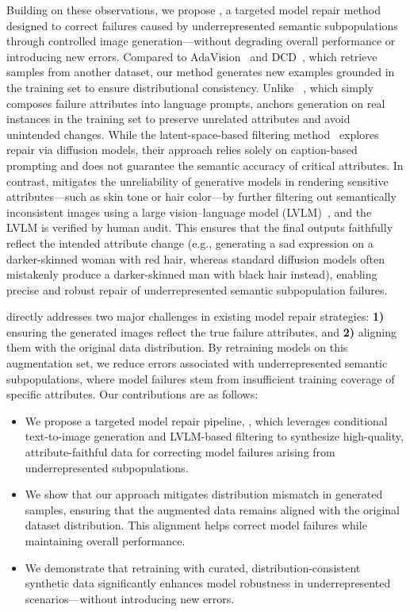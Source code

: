 Building on these observations, we propose \model, a targeted model repair method designed to correct failures caused by underrepresented semantic subpopulations through controlled image generation—without degrading overall performance or introducing new errors. Compared to AdaVision~\cite{gao2023adaptive} and DCD~\cite{singla2024data}, which retrieve samples from another dataset, our method generates new examples grounded in the training set to ensure distributional consistency. Unlike \safefix~\cite{chen2023safefix}, which simply composes failure attributes into language prompts, \model anchors generation on real instances in the training set to preserve unrelated attributes and avoid unintended changes. While the latent-space-based filtering method~\cite{jain2023latentfailures} explores repair via diffusion models, their approach relies solely on caption-based prompting and does not guarantee the semantic accuracy of critical attributes. In contrast, \model mitigates the unreliability of generative models in rendering sensitive attributes—such as skin tone or hair color—by further filtering out semantically inconsistent images using a large vision--language model (LVLM)~\cite{bai2025qwen25vl, liu2023improvedllava}, and the LVLM is verified by human audit. This ensures that the final outputs faithfully reflect the intended attribute change (e.g., generating a sad expression on a darker-skinned woman with red hair, whereas standard diffusion models often mistakenly produce a darker-skinned man with black hair instead), enabling precise and robust repair of underrepresented semantic subpopulation failures. 


\model directly addresses two major challenges in existing model repair strategies: {\bf 1)} ensuring the generated images reflect the true failure attributes, and {\bf 2)} aligning them with the original data distribution. By retraining models on this augmentation set, we reduce errors associated with underrepresented semantic subpopulations, where model failures stem from insufficient training coverage of specific attributes. Our contributions are as follows:
\begin{itemize}
\item We propose a targeted model repair pipeline, \model, which leverages conditional text-to-image generation and LVLM-based filtering to synthesize high-quality, attribute-faithful data for correcting model failures arising from underrepresented subpopulations.

\item We show that our approach mitigates distribution mismatch in generated samples, ensuring that the augmented data remains aligned with the original dataset distribution. This alignment helps correct model failures while maintaining overall performance.
\item We demonstrate that retraining with curated, distribution-consistent synthetic data significantly enhances model robustness in underrepresented scenarios—without introducing new errors.

\end{itemize}